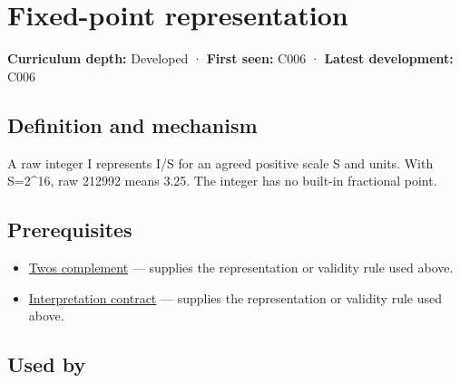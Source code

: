 \hypertarget{appendix-1d0dbe8924cc}{}\label{referencestart:appendix-1d0dbe8924cc}
\section{Fixed-point representation}\label{appendix-1d0dbe8924cc-fixed-point-representation}

\hypertarget{appendix-1d0dbe8924cc-fixed-point-representation}{}

\textbf{Curriculum depth:} Developed · \textbf{First seen:} C006 · \textbf{Latest development:} C006

\begin{allmightroledefinition}

\subsection{Definition and mechanism}\label{appendix-1d0dbe8924cc-definition-and-mechanism}

\hypertarget{appendix-1d0dbe8924cc-definition-and-mechanism}{}

A raw integer I represents I/S for an agreed positive scale S and units. With S=2\^{}16, raw 212992 means 3.25. The integer has no built-in fractional point.

\end{allmightroledefinition}

\subsection{Prerequisites}\label{appendix-1d0dbe8924cc-prerequisites}

\hypertarget{appendix-1d0dbe8924cc-prerequisites}{}

\begin{itemize}
\tightlist
\item
  \hyperref[appendix-4fbc03d20829]{Two\textquotesingle s complement} --- supplies the representation or validity rule used above.
\item
  \hyperref[appendix-f414bd4ed05c]{Interpretation contract} --- supplies the representation or validity rule used above.
\end{itemize}

\subsection{Used by}\label{appendix-1d0dbe8924cc-used-by}

\hypertarget{appendix-1d0dbe8924cc-used-by}{}

